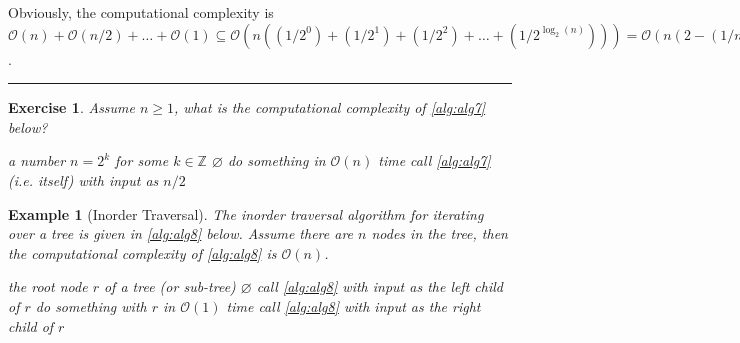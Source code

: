 \documentclass[twoside]{article}
\newtheorem{example}[theorem]{Example}
\newtheorem{exercise}[theorem]{Exercise}
\newenvironment{proof}{{\bf Explanation:}}{\hfill\rule{2mm}{2mm}}
\begin{document}
\begin{proof}
    Obviously, the computational complexity is $\mathcal{O}(n)+\mathcal{O}(n/2)+\ldots+\mathcal{O}(1)\subseteq\mathcal{O}(n((1/2^{0})+(1/2^{1})+(1/2^{2})+\ldots+(1/2^{\log_{2}(n)})))=\mathcal{O}(n(2-(1/n)))=\mathcal{O}(2n-1)=\mathcal{O}(n)$.
\end{proof}

\begin{exercise}\normalfont
    Assume $n\geq 1$, what is the computational complexity of \autoref{alg:alg7} below?
\begin{algorithm}[!ht]
\begin{algorithmic}[1]
\REQUIRE a number $n=2^{k}$ for some $k\in\mathbb{Z}$
\ENSURE $\varnothing$
\STATE do something in $\mathcal{O}(n)$ time 
\STATE call \autoref{alg:alg7} (i.e. itself) with input as $n/2$
\ENDIF
\end{algorithmic}
\caption{Recursion 3}
\label{alg:alg7}
\end{algorithm}

\end{exercise}
\begin{example}[Inorder Traversal]\normalfont
    The \textit{inorder traversal} algorithm for iterating over a tree is given in \autoref{alg:alg8} below. Assume there are $n$ nodes in the tree, then the computational complexity of \autoref{alg:alg8} is $\mathcal{O}(n)$.
\begin{algorithm}[!ht]
\begin{algorithmic}[1]
\REQUIRE the root node $r$ of a tree (or sub-tree)
\ENSURE $\varnothing$
\RETURN
\ENDIF
\STATE call \autoref{alg:alg8} with input as the left child of $r$
\STATE do something with $r$ in $\mathcal{O}(1)$ time 
\STATE call \autoref{alg:alg8} with input as the right child of $r$
\end{algorithmic}
\caption{Inorder traversal}
\label{alg:alg8}
\end{algorithm}

\end{example}
\end{document}
